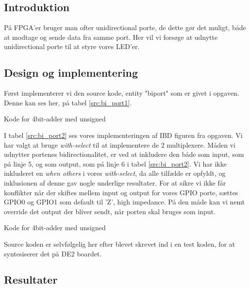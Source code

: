 \documentclass[../journal2.tex]{subfiles}
\begin{document}
\subsection{Introduktion}

På FPGA'er bruger man ofter unidirectional porte, de dette gør det muligt, både at modtage og sende data fra samme port. Her vil vi forsøge at udnytte unidirectional porte til at styre vores LED'er.


\subsection{Design og implementering}

Først implementerer vi den source kode, entity "bi\textunderscore port" som er givet i opgaven. Denne kan ses her, på tabel \ref{src:bi_port1}.

\begin{table}[H]
    \centering
      \framebox{
        \rule{8pt}{0pt}
          
  }
  \caption{Kode for 4bit-adder med unsigned}	
  \label{src:bi_port1}
\end{table}

I tabel \ref{src:bi_port2} ses vores implementeringen af IBD figuren fra opgaven. Vi har valgt at bruge \textit{with-select} til at implementere de 2 multiplexere. Måden vi udnytter portenes bidirectionalitet, er ved at inkludere den både som input, som på linje 5, og som output, som på linje 6 i tabel \ref{src:bi_port2}. Vi har ikke inkluderet en \textit{when others} i vores \textit{with-select}, da alle tilfælde er opfyldt, og inklusionen af denne gav nogle underlige resultater.
For at sikre vi ikke får konflikter når der skiftes mellem input og output for vores GPIO porte, sættes GPIO0 og GPIO1 som default til 'Z', high impedance. På den måde kan vi nemt override det output der bliver sendt, når porten skal bruges som input. 
\begin{table}[H]
    \centering
      \framebox{
        \rule{8pt}{0pt}
          
  }
  \caption{Kode for 4bit-adder med unsigned}	
  \label{src:bi_port2}
\end{table}

Source koden er selvfølgelig her efter blevet skrevet ind i en test koden, for at syntesiserer det på DE2 boardet. 


\subsection{Resultater}
\end{document}
